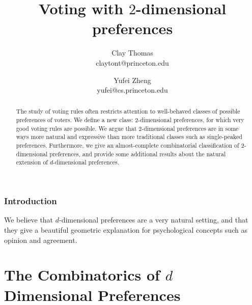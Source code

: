 \documentclass[12pt]{article}
\newcommand{\1}[1]{\mathds{1}[{#1}]}
\begin{document}
 
\title{Voting with $2$-dimensional preferences}
\author{
  Clay Thomas \\
  claytont@princeton.edu
\and
  Yufei Zheng\\
  yufei@cs.princeton.edu
}

\maketitle
\begin{abstract}
  The study of voting rules often restricts attention to
  well-behaved classes of possible preferences of voters.
  We define a new class: $2$-dimensional preferences,
  for which very good voting rules are possible.
  We argue that $2$-dimensional preferences are in some ways
  more natural and expressive than more traditional classes
  such as single-peaked preferences.
  Furthermore, we give an almost-complete combinatorial classification
  of $2$-dimensional preferences, and provide some additional
  results about the natural extension of $d$-dimensional preferences.
\end{abstract}

\section{Introduction}

  We believe that $d$-dimensional preferences are a very natural setting,
  and that they give a beautiful geometric explanation for psychological
  concepts such as opinion and agreement. 



\clearpage
\part{The Combinatorics of $d$ Dimensional Preferences}
\end{document}
